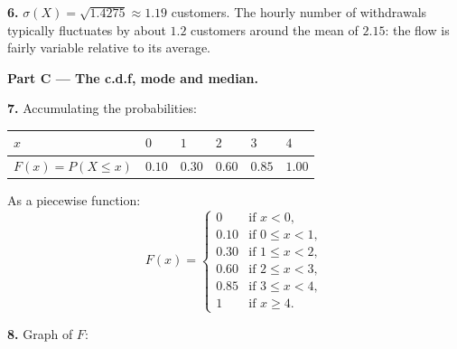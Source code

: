 \documentclass[11pt]{article}
\begin{document}
\textbf{6.} $\sigma(X)=\sqrt{1.4275}\approx 1.19$ customers. The hourly number of withdrawals typically fluctuates by about $1.2$ customers around the mean of $2.15$: the flow is fairly variable relative to its average.

\textbf{Part C — The c.d.f, mode and median.}\par

\textbf{7.} Accumulating the probabilities:

\begin{center}
\begin{tabularx}{\linewidth}{|l|X|X|X|X|X|}
\hline
\rowcolor{popblueL} $x$ & $0$ & $1$ & $2$ & $3$ & $4$ \\
\hline $F(x)=P(X\le x)$ & $0.10$ & $0.30$ & $0.60$ & $0.85$ & $1.00$ \\
\hline
\end{tabularx}
\end{center}

As a piecewise function:
\[ F(x)= \begin{cases}
0 & \text{if } x<0,\\
0.10 & \text{if } 0\le x<1,\\
0.30 & \text{if } 1\le x<2,\\
0.60 & \text{if } 2\le x<3,\\
0.85 & \text{if } 3\le x<4,\\
1 & \text{if } x\ge 4.
\end{cases} \]

\textbf{8.} Graph of $F$:
\end{document}
